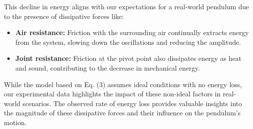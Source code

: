 This decline in energy aligns with our expectations for a real-world pendulum due to the presence of dissipative forces like:

\begin{itemize}
	\item \textbf{Air resistance:} Friction with the surrounding air continually extracts energy from the system, slowing down the oscillations and reducing the amplitude.
	\item \textbf{Joint resistance:} Friction at the pivot point also dissipates energy as heat and sound, contributing to the decrease in mechanical energy.
\end{itemize}

While the model based on Eq. (3) assumes ideal conditions with no energy loss, our experimental data highlights the impact of these non-ideal factors in real-world scenarios. The observed rate of energy loss provides valuable insights into the magnitude of these dissipative forces and their influence on the pendulum's motion.

